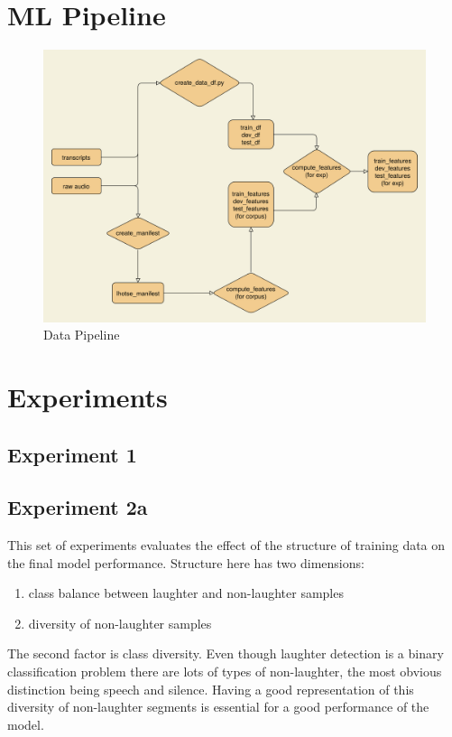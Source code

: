 \documentclass[bsc,frontabs,parskip,deptreport]{infthesis}
\begin{document}
\chapter{ML Pipeline} \label{cha:ml-pipeline}

\begin{figure}
    \centering
    \includegraphics[width=15cm]{imgs/diagrams/Pipeline.drawio.png}
    \caption{Data Pipeline}
    \label{fig:data-pipeline}
\end{figure}

\chapter{Experiments} \label{cha:experiments}

\section{Experiment 1}

\section{Experiment 2a} \label{exp:2}
This set of experiments evaluates the effect of the structure of training data on the final model performance. Structure here has two dimensions: 
\begin{enumerate}
    \item class balance between laughter and non-laughter samples
    \item diversity of non-laughter samples 
\end{enumerate}


The second factor is class diversity. Even though laughter detection is a binary classification problem there are lots of types of non-laughter, the most obvious distinction being speech and silence. Having a good representation of this diversity of non-laughter segments is essential for a good performance of the model.
\end{document}
